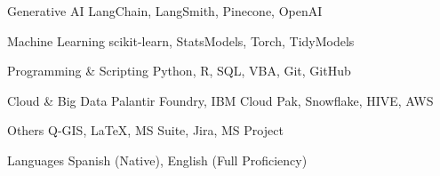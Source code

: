 
\begin{cvskills}

  \cvskill
    {Generative AI} %
    {LangChain, LangSmith, Pinecone, OpenAI} %
    
  \cvskill
    {Machine Learning} %
    {scikit-learn, StatsModels, Torch, TidyModels} %

  \cvskill
    {Programming \& Scripting} %
    {Python, R, SQL, VBA, Git, GitHub} %

  \cvskill
    {Cloud \& Big Data} %
    {Palantir Foundry, IBM Cloud Pak, Snowflake, HIVE, AWS} %

  \cvskill
    {Others} %
    {Q-GIS, LaTeX, MS Suite, Jira, MS Project} %

  \cvskill
    {Languages} %
    {Spanish (Native), English (Full Proficiency)} %

\end{cvskills}